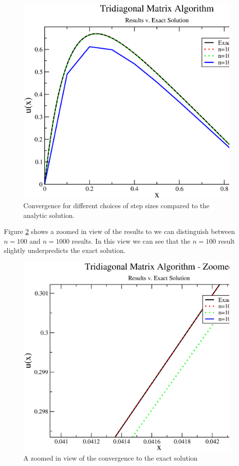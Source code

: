 \documentclass[%
oneside,                 %
final,                   %
10pt]{article}
\begin{document}
\begin{figure}[H]\label{fig:comp}
  \centering
    \includegraphics[width=1.2\textwidth]{comp.eps}
    \caption{Convergence for different choices of step sizes compared to the analytic solution.}
\end{figure}

Figure \ref{fig:compzoom} shows a zoomed in view of the results to we can distinguish between $n=100$ and $n=1000$ results.  In this view we can see that the $n=100$ result slightly underpredicts the exact solution. 

\begin{figure}[H]\label{fig:compzoom}
  \centering
    \includegraphics[width=1.2\textwidth]{compzoom.eps}
    \caption{A zoomed in view of the convergence to the exact solution}
\end{figure}
\end{document}
